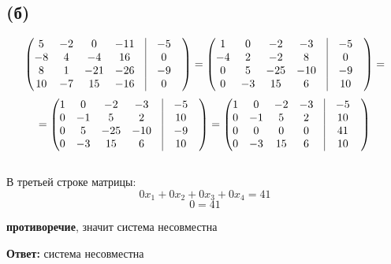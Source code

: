 \documentclass[a4paper,12pt]{article}
\begin{document}
\subsection*{(б)}
\[
\begin{pmatrix}
5 & -2 & 0 & -11 & \vrule & -5 & \\
-8 & 4 & -4 & 16 & \vrule & 0 & \\
8 & 1 & -21 & -26 & \vrule & -9 & \\
10 & -7 & 15 & -16 & \vrule & 0\\
\end{pmatrix} =
\begin{pmatrix}
1 & 0 & -2 & -3 & \vrule & -5 & \\
-4 & 2 & -2 & 8 & \vrule & 0 & \\
0 & 5 & -25 & -10 & \vrule & -9 & \\
0 & -3 & 15 & 6& \vrule & 10 \\
\end{pmatrix}  = 
\]
\[=
\begin{pmatrix}
1 & 0 & -2 & -3 & \vrule & -5 & \\
0& -1 & 5 & 2 & \vrule & 10 & \\
0 & 5 & -25 & -10 & \vrule & -9 & \\
0 & -3 & 15 & 6& \vrule & 10 \\
\end{pmatrix}  = 
\begin{pmatrix}
1 & 0 & -2 & -3 & \vrule & -5 & \\
0& -1 & 5 & 2 & \vrule & 10 & \\
0 & 0 & 0 & 0& \vrule & 41 & \\
0 & -3 & 15 & 6& \vrule & 10 \\
\end{pmatrix}  
\]
\\
В третьей строке матрицы:
\[
0x_1 + 0x_2 + 0x_3 + 0x_4 = 41
\]
\[
0 = 41
\]
\begin{center}
\textbf{противоречие}, значит система несовместна \\
\end{center}
\begin{large}
\begin{center}
\textbf{Ответ:}  система несовместна
\end{center}
\end{large}
\end{document}
